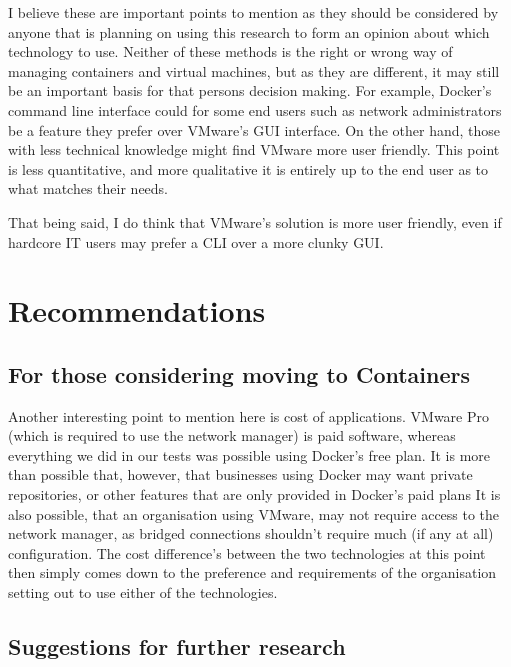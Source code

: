 I believe these are important points to mention as they should be considered by anyone that is planning on using this research to form an opinion about which technology to use. Neither of these methods is the right or wrong way of managing containers and virtual machines, but as they are different, it may still be an important basis for that persons decision making. For example, Docker's command line interface could for some end users such as network administrators be a feature they prefer over VMware's GUI interface. On the other hand, those with less technical knowledge might find VMware more user friendly. This point is less quantitative, and more qualitative it is entirely up to the end user as to what matches their needs.

That being said, I do think that VMware's solution is more user friendly, even if hardcore IT users may prefer a CLI over a more clunky GUI.



\chapter{Recommendations}

\section{For those considering moving to Containers}


Another interesting point to mention here is cost of applications. VMware Pro (which is required to use the network manager) is paid software, whereas everything we did in our tests was possible using Docker's free plan. It is more than possible that, however, that businesses using Docker may want private repositories, or other features that are only provided in Docker's paid plans It is also possible, that an organisation using VMware, may not require access to the network manager, as bridged connections shouldn't require much (if any at all) configuration. The cost difference's between the two technologies at this point then simply comes down to the preference and requirements of the organisation setting out to use either of the technologies.


\section{Suggestions for further research}